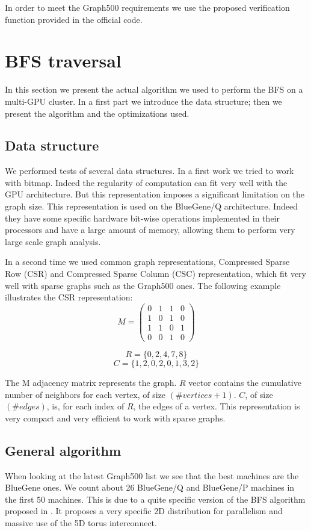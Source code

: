 In order to meet the Graph500 requirements we use the proposed verification function provided in the official code.

\section{BFS traversal}
In this section we present the actual algorithm we used to perform the BFS on a multi-GPU cluster. 
In a first part we introduce the data structure; then we present the algorithm and the optimizations used.

\subsection{Data structure}
We performed tests of several data structures.
In a first work we tried to work with bitmap. Indeed the regularity of computation can fit very well with the GPU architecture. But this representation imposes a significant limitation on the graph size. 
This representation is used on the BlueGene/Q architecture. 
Indeed they have some specific hardware bit-wise operations implemented in their processors and have a large amount of memory, allowing them to perform very large scale graph analysis. 

In a second time we used common graph representations, Compressed Sparse Row (CSR) and Compressed Sparse Column (CSC) representation, which fit very well with sparse graphs such as the Graph500 ones.
The following example illustrates the CSR representation:
$$M = \begin{pmatrix}
0 & 1 & 1 & 0 \\ 
1 & 0 & 1 & 0 \\ 
1 & 1 & 0 & 1 \\ 
0 & 0 & 1 & 0
\end{pmatrix} $$

$$R = \{0,2,4,7,8\}$$
$$C= \{1,2,0,2,0,1,3,2\}$$

The M adjacency matrix represents the graph. $R$ vector contains the cumulative number of neighbors for each vertex, of size $(\#vertices +1)$. $C$, of size $(\#edges)$, is, for each index of $R$, the edges of a vertex.
This representation is very compact and very efficient to work with sparse graphs. 

\subsection{General algorithm}

When looking at the latest Graph500 list we see that the best machines are the BlueGene ones. 
We count about 26 BlueGene/Q and BlueGene/P machines in the first 50  machines.
This is due to a quite specific version of the BFS algorithm proposed in \cite{6468459}. 
It proposes a very specific 2D distribution for parallelism and massive use of the 5D torus interconnect. 

